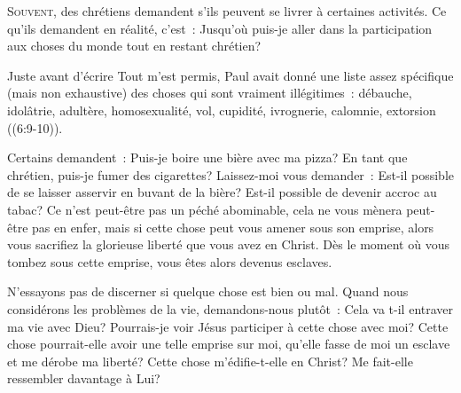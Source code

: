 \lettrine{S}{ouvent}, 
 des chrétiens demandent s'ils peuvent se livrer
 à certaines activités. Ce qu'ils demandent en réalité,
 c'est~:
 \Og Jusqu'où puis-je aller dans la participation
 aux choses du monde tout en restant chrétien? \Fg{}

Juste avant d'écrire \Og Tout m'est permis, \Fg{}
 Paul avait donné une liste assez spécifique
 (mais non exhaustive) des choses qui sont vraiment illégitimes~:
 débauche, idolâtrie, adultère, homosexualité,
 vol, cupidité, ivrognerie, calomnie, extorsion
 ((6:9-10)).


Certains demandent~:
 \Og Puis-je boire une bière avec ma pizza?
 En tant que chrétien, puis-je fumer des cigarettes? \Fg{}
 Laissez-moi vous demander~: 
 \Og Est-il possible de se laisser asservir en buvant de la bière?
 Est-il possible de devenir accroc au tabac? \Fg{}
 Ce n'est peut-être pas un péché abominable,
 cela ne vous mènera peut-être pas en enfer,
 mais si cette chose peut vous amener sous son emprise,
 alors vous sacrifiez la glorieuse liberté que vous avez en Christ.
 Dès le moment où vous tombez sous cette emprise,
 vous êtes alors devenus esclaves.

N'essayons pas de discerner si quelque chose est bien ou mal.
 Quand nous considérons les problèmes de la vie,
 demandons-nous plutôt~: \Og {}
 Cela va t-il entraver ma vie avec Dieu?
 Pourrais-je voir Jésus participer à cette chose avec moi?
 Cette chose pourrait-elle avoir une telle emprise sur moi,
 qu'elle fasse de moi un esclave et me dérobe ma liberté?
 Cette chose m'édifie-t-elle en Christ?
 Me fait-elle ressembler davantage à Lui? \Fg{}

\dvrule







